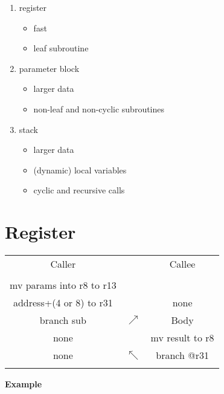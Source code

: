 \begin{enumerate}
    \item register
    \begin{itemize}
        \item fast
        \item leaf subroutine
    \end{itemize}
    \item parameter block
    \begin{itemize}
        \item larger data
        \item non-leaf and non-cyclic subroutines
    \end{itemize}

    \item stack
    \begin{itemize}
        \item larger data
        \item (dynamic) local variables
        \item cyclic and recursive calls
    \end{itemize}
\end{enumerate}

\section{Register}

\begin{tabular}{|c|c|c|}
  \multicolumn{1}{c}{Caller} & \multicolumn{1}{c}{ } & \multicolumn{1}{c}{Callee} \\
  & \multicolumn{1}{c}{ } & \multicolumn{1}{c}{} \\ \cline{1-1}
  mv params into r8 to r13 & & \\ \cline{3-3}
  address+(4 or 8) to r31  &  & none \\ \cline{3-3}
  branch sub     & $\nearrow$  & Body \\ \cline{1-1} \cline{3-3}
  none           &   & mv result to r8 \\
  none           & $\nwarrow$ & branch @r31 \\ \cline{1-1} \cline{3-3}
  & & \\
\end{tabular}



\vspace{6pt}
\textbf{Example}
\vspace{6pt}

